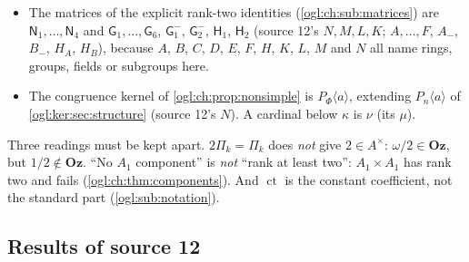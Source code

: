 \documentclass[11pt,oneside]{article}
\numberwithin{equation}{section}
\theoremstyle{definition}
\theoremstyle{remark}
\newcommand{\Oz}{\mathbf{Oz}}
\newcommand{\Z}{\mathbb Z}
\newcommand{\ct}{\operatorname{ct}}
\begin{document}
\begin{itemize}[leftmargin=*]
(\cref{ogl:lat:sec:unimodular}); $L$ is a compressed field and $L_j$ are
integral points. A basis of $\mathfrak l$ is $\mathsf b_1,\dots,\mathsf b_d$
(its $b_i$), the structure integers are $z_{lij}$ (its $n_{\ell ij}$), the
standard basis of $\mathfrak{sl}_2(\Z)$ is $\mathsf e,\mathsf f,\mathsf h$ (its
$e,f,h$; $e_{ij}$ are elementary matrices and $e_\alpha$ basis vectors of
$\Gamma_\kappa$), a target Lie ring is $\mathfrak H$ (its $M$), and the
integral functional of \cref{ogl:ch:thm:lienegative} is $\varpi$ (its
$\lambda$, a cardinal in \cref{ogl:el:part}).
\item The matrices of the explicit rank-two identities
(\cref{ogl:ch:sub:matrices}) are $\mathsf N_1,\dots,\mathsf N_4$ and
$\mathsf G_1,\dots,\mathsf G_6$, $\mathsf G_1^-$, $\mathsf G_2^-$,
$\mathsf H_1$, $\mathsf H_2$ (source 12's $N,M,L,K$; $A,\dots,F$, $A_-$, $B_-$,
$H_A$, $H_B$), because $A$, $B$, $C$, $D$, $E$, $F$, $H$, $K$, $L$, $M$ and $N$ all
name rings, groups, fields or subgroups here.
\item The congruence kernel of \cref{ogl:ch:prop:nonsimple} is
$P_\Phi\langle a\rangle$, extending $P_n\langle a\rangle$ of
\cref{ogl:ker:sec:structure} (source 12's $N$). A cardinal below $\kappa$ is
$\nu$ (its $\mu$).
\end{itemize}
Three readings must be kept apart. $2\Pi_k=\Pi_k$ does \emph{not} give
$2\in A^\times$: $\omega/2\in\Oz$, but $1/2\notin\Oz$. ``No $A_1$ component''
is \emph{not} ``rank at least two'': $A_1\times A_1$ has rank two and fails
(\cref{ogl:ch:thm:components}). And $\ct$ is the constant coefficient, not the
standard part (\cref{ogl:sub:notation}).

\subsection{Results of source 12}\label{ogl:ch:sub:results}
\end{document}
